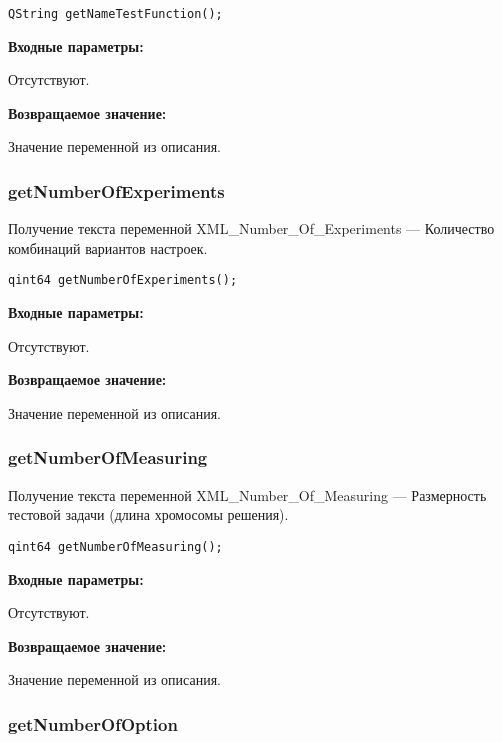 \documentclass[a4paper,12pt]{article}
\begin{document}
\begin{lstlisting}[label=code_syntax_getNameTestFunction,caption=Синтаксис]
QString getNameTestFunction();
\end{lstlisting}

\textbf{Входные параметры:}

Отсутствуют.

\textbf{Возвращаемое значение:}

Значение переменной из описания.


\subsubsection{getNumberOfExperiments}\label{getNumberOfExperiments}

Получение текста переменной  XML\_Number\_Of\_Experiments --- Количество комбинаций вариантов настроек.


\begin{lstlisting}[label=code_syntax_getNumberOfExperiments,caption=Синтаксис]
qint64 getNumberOfExperiments();
\end{lstlisting}

\textbf{Входные параметры:}

Отсутствуют.

\textbf{Возвращаемое значение:}

Значение переменной из описания.


\subsubsection{getNumberOfMeasuring}\label{getNumberOfMeasuring}

Получение текста переменной  XML\_Number\_Of\_Measuring --- Размерность тестовой задачи (длина хромосомы решения).


\begin{lstlisting}[label=code_syntax_getNumberOfMeasuring,caption=Синтаксис]
qint64 getNumberOfMeasuring();
\end{lstlisting}

\textbf{Входные параметры:}

Отсутствуют.

\textbf{Возвращаемое значение:}

Значение переменной из описания.


\subsubsection{getNumberOfOption}\label{getNumberOfOption}
\end{document}
